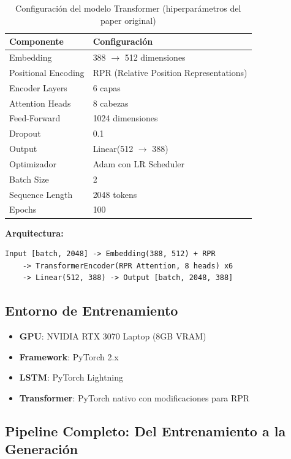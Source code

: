 \documentclass[12pt,a4paper]{article}
\begin{document}
\begin{table}[H]
\centering
\begin{tabular}{ll}
\toprule
\textbf{Componente} & \textbf{Configuración} \\
\midrule
Embedding & 388 $\rightarrow$ 512 dimensiones \\
Positional Encoding & RPR (Relative Position Representations) \\
Encoder Layers & 6 capas \\
Attention Heads & 8 cabezas \\
Feed-Forward & 1024 dimensiones \\
Dropout & 0.1 \\
Output & Linear(512 $\rightarrow$ 388) \\
\midrule
Optimizador & Adam con LR Scheduler \\
Batch Size & 2 \\
Sequence Length & 2048 tokens \\
Epochs & 100 \\
\bottomrule
\end{tabular}
\caption{Configuración del modelo Transformer (hiperparámetros del paper original)}
\end{table}

\textbf{Arquitectura:}
\begin{lstlisting}
Input [batch, 2048] -> Embedding(388, 512) + RPR
    -> TransformerEncoder(RPR Attention, 8 heads) x6
    -> Linear(512, 388) -> Output [batch, 2048, 388]
\end{lstlisting}

\subsection{Entorno de Entrenamiento}
\begin{itemize}
    \item \textbf{GPU}: NVIDIA RTX 3070 Laptop (8GB VRAM)
    \item \textbf{Framework}: PyTorch 2.x
    \item \textbf{LSTM}: PyTorch Lightning
    \item \textbf{Transformer}: PyTorch nativo con modificaciones para RPR
\end{itemize}

\subsection{Pipeline Completo: Del Entrenamiento a la Generación}
\end{document}

